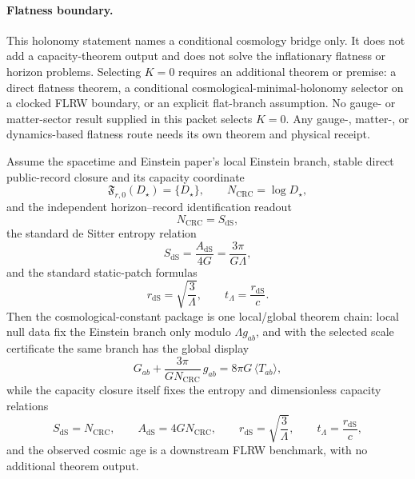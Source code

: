 \paragraph{Flatness boundary.}
This holonomy statement names a conditional cosmology bridge only. It does not add a capacity-theorem
output and does not solve the inflationary flatness or horizon problems. Selecting \(K=0\) requires
an additional theorem or premise: a direct flatness theorem, a conditional
cosmological-minimal-holonomy selector on a clocked FLRW boundary, or an explicit flat-branch
assumption. No gauge- or matter-sector result supplied in this packet selects
\(K=0\). Any gauge-, matter-, or dynamics-based flatness route needs its own
theorem and physical receipt.

\begin{theorem}
Assume the spacetime and Einstein paper's local Einstein branch, stable direct public-record closure and its
capacity coordinate
\[
\mathfrak F_{r,0}(D_\star)=\{D_\star\},
\qquad N_{\mathrm{CRC}}=\log D_\star,
\]
and the independent horizon--record identification readout
\[
N_{\mathrm{CRC}}=S_{\mathrm{dS}},
\]
\noindent the standard de Sitter entropy relation
\[
S_{\mathrm{dS}}=\frac{A_{\mathrm{dS}}}{4G}=\frac{3\pi}{G\Lambda},
\]
and the standard static-patch formulas
\[
r_{\mathrm{dS}}=\sqrt{\frac{3}{\Lambda}},
\qquad
t_\Lambda=\frac{r_{\mathrm{dS}}}{c}.
\]
Then the cosmological-constant package is one local/global theorem chain: local null data fix the
Einstein branch only modulo \(\Lambda g_{ab}\), and with the selected scale certificate the same branch
has the global display
\[
G_{ab}+\frac{3\pi}{G N_{\mathrm{CRC}}}\,g_{ab}=8\pi G\,\langle T_{ab}\rangle,
\]
while the capacity closure itself fixes the entropy and dimensionless capacity relations
\[
S_{\mathrm{dS}}=N_{\mathrm{CRC}},
\qquad
A_{\mathrm{dS}}=4G N_{\mathrm{CRC}},
\qquad
r_{\mathrm{dS}}=\sqrt{\frac{3}{\Lambda}},
\qquad
t_\Lambda=\frac{r_{\mathrm{dS}}}{c},
\]
and the observed cosmic age is a downstream FLRW benchmark, with no additional theorem
output.
\end{theorem}

